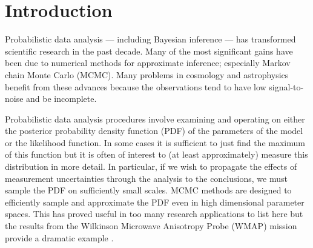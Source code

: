 \documentclass[12pt,preprint]{aastex}
\begin{document}
\section{Introduction}

Probabilistic data analysis --- including Bayesian inference --- has
transformed scientific research in the past decade. Many of the most
significant gains have been due to numerical methods for approximate
inference; especially Markov chain Monte Carlo (MCMC). Many
problems in cosmology and astrophysics benefit from these advances because
the observations tend to have low signal-to-noise and be incomplete.

Probabilistic data analysis procedures involve examining and operating on
either the posterior probability density function (PDF) of the parameters
of the model or the likelihood function. In some cases it is
sufficient to just find the maximum of this function but it is often of
interest to (at least approximately) measure this distribution in more detail.
In particular, if we wish to propagate the effects of measurement
uncertainties through the analysis to the conclusions, we must sample the
PDF on sufficiently small scales. MCMC methods are designed to efficiently
sample and approximate the PDF even in high dimensional
parameter spaces. This has proved useful in too many research
applications to list here but the results from the Wilkinson Microwave
Anisotropy Probe (WMAP) mission provide a dramatic example
\citep[for example][]{Dunkley:2005}.
\end{document}
